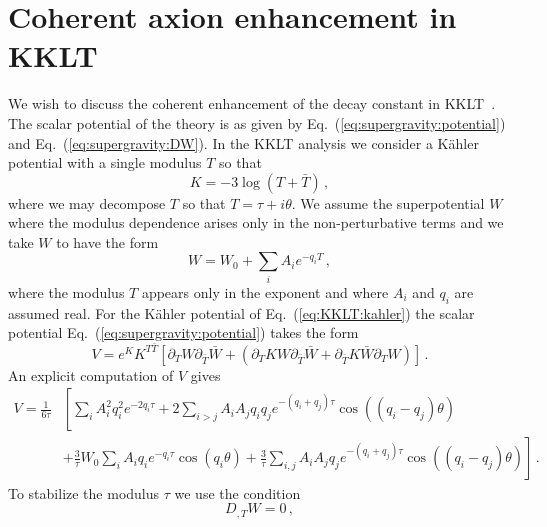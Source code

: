 \documentclass[12pt]{article}
\begin{document}

\section{Coherent axion enhancement in KKLT \label{sec:KKLT}}
We wish to discuss the coherent enhancement of the decay constant in KKLT~\cite{Kachru:2003aw}.
The scalar potential of the theory is as given by Eq.~(\ref{eq:supergravity:potential}) and Eq.~(\ref{eq:supergravity:DW}).
In the KKLT analysis we consider a K\"ahler potential with a single modulus $T$ so that
\begin{equation} \label{eq:KKLT:kahler}
  K = -3 \log\left(T + \bar T\right)\,,
\end{equation}
where we may decompose $T$ so that $T = \tau + i \theta$.
We assume the superpotential $W$ where the modulus dependence arises only in the non-perturbative terms and we take $W$ to have the form
\begin{equation} \label{eq:KKLT:W}
  W = W_0 + \sum_i A_i e^{-q_i T}\,,
\end{equation}
where the modulus $T$ appears only in the exponent and where $A_i$ and $q_i$ are assumed real.
For the K\"ahler potential of Eq.~(\ref{eq:KKLT:kahler}) the scalar potential Eq.~(\ref{eq:supergravity:potential}) takes the form
\begin{equation}
  V = e^K K^{T \bar T} \left[
    \partial_T W \partial_{\bar T} \bar W +
    \left(\partial_T K W \partial_{\bar T} \bar W + \partial_{\bar T} K \bar W \partial_T W\right)
  \right]\,.
\end{equation}
An explicit computation of $V$ gives
\begin{equation} \label{eq:KKLT:VslowUnstabilized}
  \begin{aligned}
    V = \frac{1}{6 \tau} &\left[
        \sum_i A^2_i q^2_i e^{-2 q_i \tau}
      + 2 \sum_{i > j} A_i A_j q_i q_j e^{-\left(q_i + q_j\right)\tau}
        \cos\left(\left(q_i - q_j\right) \theta\right)\right.\\
    &{}\left. + \frac{3}{\tau} W_0 \sum_i A_i q_i e^{-q_i \tau} \cos\left(q_i \theta\right)
      + \frac{3}{\tau} \sum_{i, j} A_i A_j q_j e^{-\left(q_i + q_j\right) \tau}
        \cos\left(\left(q_i - q_j\right)\theta\right)
    \right]\,.
  \end{aligned}
\end{equation}
To stabilize the modulus $\tau$ we use the condition~\cite{Nath:1983aw}
\begin{equation} \label{eq:KKLT:stabilization}
  D_{,T} W = 0\,,
\end{equation}
\end{document}
